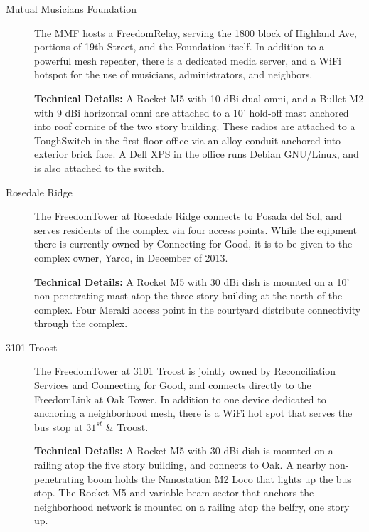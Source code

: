 \begin{description}
\item[Mutual Musicians Foundation] The MMF hosts a FreedomRelay, serving the
1800 block of Highland Ave, portions of 19th Street, and the Foundation itself.
In addition to a powerful mesh repeater, there is a dedicated media server, and a WiFi hotspot for the use
of musicians, administrators, and neighbors. \par
{\bf Technical Details:} A Rocket M5 with 10 dBi dual-omni, and a Bullet M2 with
9 dBi horizontal omni are attached to a 10'
hold-off mast anchored into roof cornice of the two story building. These radios
are attached to a ToughSwitch in the
first floor office via an alloy conduit anchored into exterior brick face. A
Dell XPS in the office runs Debian GNU/Linux, and is also attached to the
switch. 

\item[Rosedale Ridge]
The FreedomTower at Rosedale Ridge connects to Posada del Sol, and serves
residents of the complex via four access points. While the eqipment there is currently owned
by Connecting for Good, it is to be given to the complex owner, Yarco,
in December of 2013. \par
{\bf Technical Details:} A Rocket M5 with 30 dBi dish is mounted on a 10'
non-penetrating mast atop the three story building at the north of the complex.
Four Meraki access point in the courtyard distribute connectivity through the
complex.

\item[3101 Troost] The FreedomTower at 3101 Troost is jointly owned by
Reconciliation Services and Connecting for Good, and connects directly to the
FreedomLink at Oak Tower. In addition to one device dedicated to anchoring a
neighborhood mesh, there is a WiFi hot spot that serves the bus stop at
$31^{st}$ \& Troost. \par
{\bf Technical Details:} A Rocket M5 with 30 dBi dish is mounted on a railing
atop the five story building, and connects to Oak. A nearby non-penetrating boom
holds the Nanostation M2 Loco that lights up the bus stop. The Rocket M5 and
variable beam sector
that anchors the neighborhood network is mounted on a railing atop the belfry, one story up. 
\end{description}

